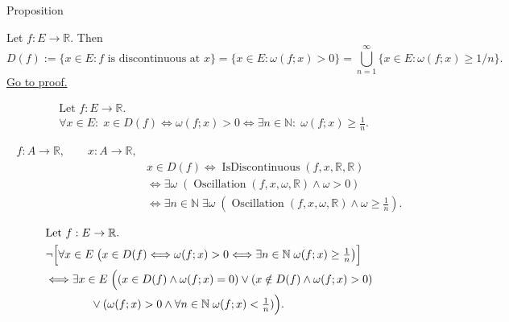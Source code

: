 
\begin{propositionbox}{Proposition}
\begin{proposition}
\label{prop:discontinuity-set-via-oscillation}
Let $f:E\to\mathbb{R}$. Then
\[
D(f):=\{x\in E: f \text{ is discontinuous at } x\}
=\{x\in E: \omega(f;x)>0\}
=\bigcup_{n=1}^{\infty} \{x\in E: \omega(f;x)\ge 1/n\}.
\]
\hyperref[prf:discontinuity-set-via-oscillation]{Go to proof.}
\end{proposition}
\end{propositionbox}

\begin{remark*}
\[
\begin{aligned}
&\text{Let } f:E\to\mathbb{R}.\\
&\forall x\in E:\;
x\in D(f)
\Longleftrightarrow \omega(f;x)>0
\Longleftrightarrow
\exists n\in\mathbb{N}:\; \omega(f;x)\ge \tfrac1n.
\end{aligned}
\]
\end{remark*}

\begin{remark*}
\[
\begin{aligned}
  f\colon A\to\mathbb{R},\qquad
  x\colon A\to\mathbb{R},\\
&x\in D(f)
\Longleftrightarrow
\operatorname{IsDiscontinuous}(f,x,\mathbb{R},\mathbb{R})\\
&\Longleftrightarrow
\exists \omega\;(\operatorname{Oscillation}(f,x,\omega,\mathbb{R})\land \omega>0)\\
&\Longleftrightarrow
\exists n\in\mathbb{N}\;\exists \omega\;(\operatorname{Oscillation}(f,x,\omega,\mathbb{R})\land \omega\ge \tfrac1n).
\end{aligned}
\]
\end{remark*}

\begin{remark*}
\[
\begin{aligned}
&\text{Let } f:E\to\mathbb{R}.\\
&\neg\Bigl[\forall x\in E\;\bigl(x\in D(f)\Longleftrightarrow \omega(f;x)>0 \Longleftrightarrow \exists n\in\mathbb{N}\; \omega(f;x)\ge \tfrac1n\bigr)\Bigr]\\
&\Longleftrightarrow \exists x\in E\;\Bigl((x\in D(f)\land \omega(f;x)=0)\lor(x\notin D(f)\land \omega(f;x)>0)\\
&\qquad\qquad\lor(\omega(f;x)>0\land \forall n\in\mathbb{N}\; \omega(f;x)<\tfrac1n)\Bigr).
\end{aligned}
\]
\end{remark*}

